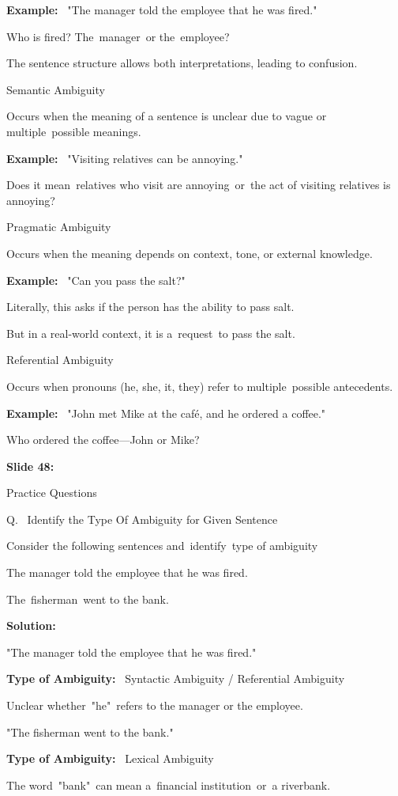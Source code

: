 \documentclass[11pt,a4paper]{article}
\begin{document}
\textbf{Example:}  "The manager told the employee that he was fired."

Who is fired? The manager or the employee?

The sentence structure allows both interpretations, leading to confusion.

Semantic Ambiguity

Occurs when the meaning of a sentence is unclear due to vague or multiple possible meanings.

\textbf{Example:}  "Visiting relatives can be annoying."

Does it mean relatives who visit are annoying or the act of visiting relatives is annoying?

Pragmatic Ambiguity

Occurs when the meaning depends on context, tone, or external knowledge.

\textbf{Example:}  "Can you pass the salt?"

Literally, this asks if the person has the ability to pass salt.

But in a real-world context, it is a request to pass the salt.

Referential Ambiguity

Occurs when pronouns (he, she, it, they) refer to multiple possible antecedents.

\textbf{Example:}  "John met Mike at the café, and he ordered a coffee."

Who ordered the coffee—John or Mike?

\textbf{Slide 48:}

Practice Questions

Q.  Identify the Type Of Ambiguity for Given Sentence

Consider the following sentences and identify type of ambiguity

The manager told the employee that he was fired.

The fisherman went to the bank.

\textbf{Solution:} 

"The manager told the employee that he was fired."

\textbf{Type of Ambiguity:}  Syntactic Ambiguity / Referential Ambiguity

Unclear whether "he" refers to the manager or the employee.

"The fisherman went to the bank."

\textbf{Type of Ambiguity:}  Lexical Ambiguity

The word "bank" can mean a financial institution or a riverbank.
\end{document}
